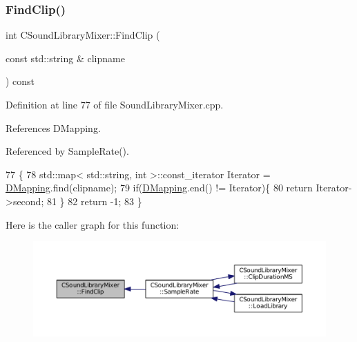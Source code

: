 \subsubsection{\texorpdfstring{Find\+Clip()}{FindClip()}}
{\footnotesize\ttfamily int C\+Sound\+Library\+Mixer\+::\+Find\+Clip (\begin{DoxyParamCaption}\item[{const std\+::string \&}]{clipname }\end{DoxyParamCaption}) const}



Definition at line 77 of file Sound\+Library\+Mixer.\+cpp.



References D\+Mapping.



Referenced by Sample\+Rate().


\begin{DoxyCode}
77                                                                \{
78     std::map< std::string, int >::const\_iterator Iterator = \hyperlink{classCSoundLibraryMixer_a8f193156cafc61b64f04ed88dcabd27d}{DMapping}.find(clipname);
79     \textcolor{keywordflow}{if}(\hyperlink{classCSoundLibraryMixer_a8f193156cafc61b64f04ed88dcabd27d}{DMapping}.end() != Iterator)\{
80         \textcolor{keywordflow}{return} Iterator->second;
81     \}
82     \textcolor{keywordflow}{return} -1;
83 \}
\end{DoxyCode}
Here is the caller graph for this function\+:\nopagebreak
\begin{figure}[H]
\begin{center}
\leavevmode
\includegraphics[width=350pt]{classCSoundLibraryMixer_ad8cc956bda999fe677e92f7392834b7a_icgraph}
\end{center}
\end{figure}
\hypertarget{classCSoundLibraryMixer_a67d0364979fab26c2b2467357ec03696}{}\label{classCSoundLibraryMixer_a67d0364979fab26c2b2467357ec03696} 
